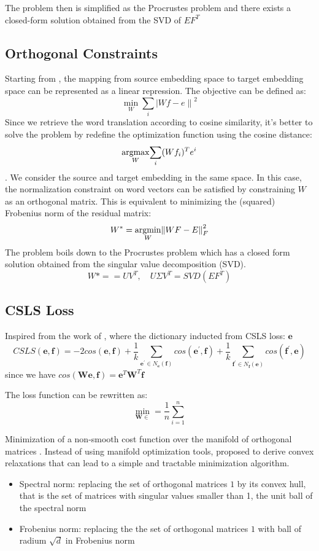 The problem then is simplified as the Procrustes problem and there exists a closed-form solution obtained from the SVD of ${EF^T}$

\subsection{Orthogonal Constraints}
Starting from \cite{mikolov2013exploiting}, the mapping from source embedding space to target embedding space can be represented as a linear repression. The objective can be defined as:
\[ \min_{W} \sum_{i} {\lvert Wf - e  \rVert}^2 \]
Since we retrieve the word translation according to cosine similarity, it's better to solve the problem by redefine the optimization function using the cosine distance:
\[ \underset{W}{\operatorname{argmax}} {\sum_{i} (W f_i)^T e^i} \]. We consider the source and target embedding in the same space. In this case, the normalization constraint on word vectors can be satisfied by constraining $W$ as an orthogonal matrix. 
This is equivalent to minimizing the (squared) Frobenius norm of the residual matrix:
\[ W^* = \underset{W}{\operatorname{argmin}} {\lVert WF - E \rVert}^2_F \]
The problem boils down to the Procrustes problem which has a closed form solution obtained from the singular value decomposition (SVD).
\[W* = = UV^T , \quad U\Sigma V^T = SVD(EF^T) \]
\subsection{CSLS Loss}
Inspired from the work of \cite{conneau2017word}, where the dictionary inducted from CSLS loss: ${\bm{e}}$
\[ CSLS(\bm{e} ,\bm{f}) = -2 cos(\bm{e}, \bm{f}) + \frac{1}{k} \sum_{\bm{e}^{\prime} \in N_{\bm{e}}(\bm{f})} {cos(\bm{e}^{\prime}, \bm{f})}+ \frac{1}{k}  \sum_{\bm{f}^{\prime} \in N_{\bm{f}}(\bm{e})   } {cos(\bm{f}^{\prime}, \bm{e})}\]
since we have ${cos(\bm{We}, \bm{f}) = \bm{e}^T \bm{W}^T \bm{f}}$

The loss function can be rewritten as:
\[ \min_{\bm{W} \in } = \frac{1}{n} \sum_{i=1}^{n} \]


Minimization of a non-smooth cost function over the manifold of orthogonal matrices . Instead of using manifold optimization tools, \cite{bibid} proposed to derive convex relaxations that can lead to a simple and tractable minimization algorithm.
\begin{itemize}
	\item Spectral norm:
	replacing the set of orthogonal matrices $1$ by its convex hull, that is the set of matrices with singular values smaller than 1, the unit ball of the spectral norm 
	\item Frobenius norm:
	replacing the the set of orthogonal matrices $1$ with ball of radium $\sqrt{d}$ in Frobenius norm
\end{itemize}
 
